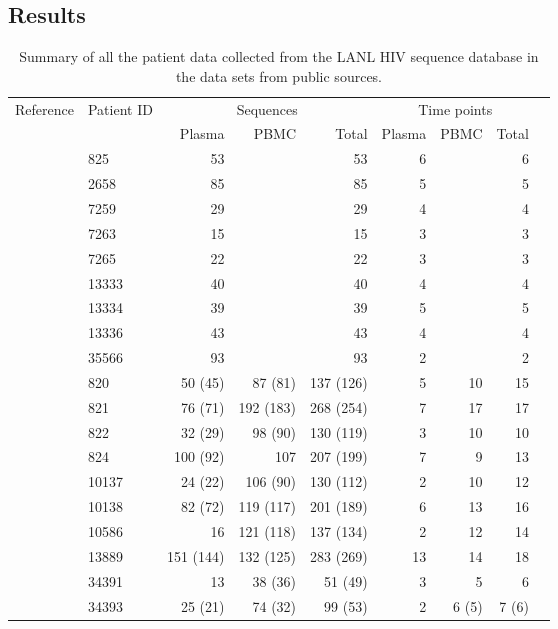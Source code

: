 \documentclass[12pt]{article}
\begin{document}
\subsection{Results}


\begin{table*}
\caption{Summary of all the patient data collected from the LANL HIV sequence database \cite{LosAlamos} in the data sets from public sources.\label{tab:patients}}
\def\arraystretch{1.3}%
\begin{center}
\begin{tabular}{llrrrrrrr} 

Reference & Patient ID & \multicolumn{3}{c}{Sequences} & \multicolumn{3}{c}{Time points} \\
 &  & Plasma & PBMC & Total & Plasma & PBMC & Total\\
\hline
\cite{McCloskey14} & 825 & 53 & & 53 & 6 & & 6 \\
& 2658 & 85 & & 85 & 5 & & 5 \\
& 7259 & 29 & & 29 & 4 & & 4 \\
& 7263 & 15 & & 15 & 3 & & 3 \\
& 7265 & 22 & & 22 & 3 & & 3 \\
& 13333 & 40 & & 40 & 4 & & 4 \\
& 13334 & 39 & & 39 & 5 & & 5 \\
& 13336 & 43 & & 43 & 4 & & 4 \\
& 35566 & 93 & & 93 & 2 & & 2 \\
\hline
\cite{Shankarappa99} & 820 & 50 (45) & 87 (81) & 137 (126) & 5 & 10 & 15 \\
& 821 & 76 (71) & 192 (183) & 268 (254) & 7 & 17 & 17 \\ 
& 822 & 32 (29) & 98 (90) & 130 (119) & 3 & 10 & 10 \\ 
& 824 & 100 (92) & 107 & 207 (199) & 7 & 9 & 13 \\
& 10137 & 24 (22) & 106 (90) & 130 (112) & 2 & 10 & 12 \\
& 10138 & 82 (72) & 119 (117) & 201 (189) & 6 & 13 & 16 \\
& 10586 & 16 & 121 (118) & 137 (134) & 2 & 12 & 14 \\ 
& 13889 & 151 (144) & 132 (125) & 283 (269) & 13 & 14 & 18 \\
\cite{Novitsky09}%
& 34391 & 13 & 38 (36) & 51 (49) & 3 & 5 & 6 \\
& 34393 & 25 (21) & 74 (32) & 99 (53) & 2 & 6 (5) & 7 (6) \\

\end{tabular}
\end{center}
\end{table*}
\end{document}

